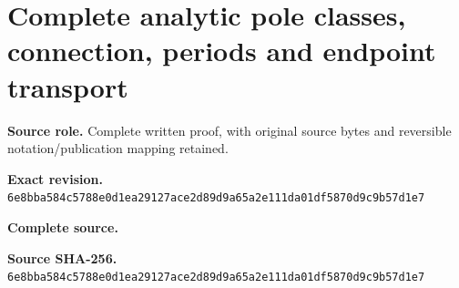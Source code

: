 \begingroup
\sloppy
\small
\section{Complete analytic pole classes, connection, periods and endpoint transport}
\noindent\textbf{Source role.} Complete written proof, with original source bytes and reversible notation/publication mapping retained.\par
\noindent\textbf{Exact revision.} \nolinkurl{6e8bba584c5788e0d1ea29127ace2d89d9a65a2e111da01df5870d9c9b57d1e7}\par
\noindent\textbf{Complete source.} \par
\noindent\textbf{Source SHA-256.} \nolinkurl{6e8bba584c5788e0d1ea29127ace2d89d9a65a2e111da01df5870d9c9b57d1e7}\par\medskip

\endgroup
